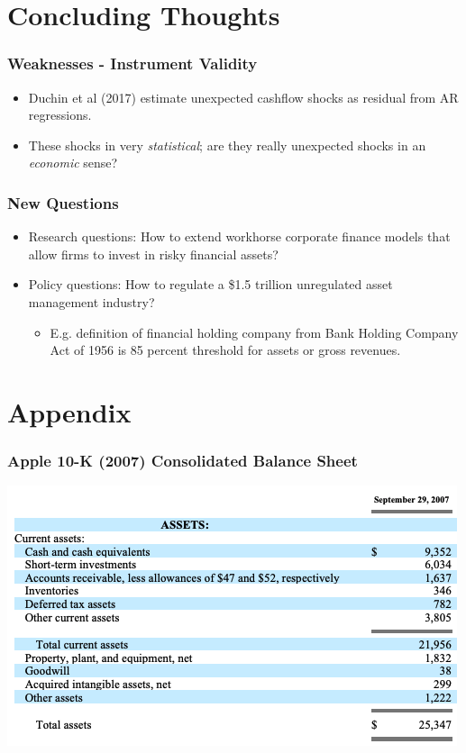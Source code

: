 \documentclass[handout]{beamer}
\begin{document}
\section{Concluding Thoughts}




\begin{frame}
\frametitle{Weaknesses - Instrument Validity}
\begin{itemize}[<+->]
\item Duchin et al (2017) estimate unexpected cashflow shocks as residual from AR regressions.
\bigskip
\item These shocks in very \textit{statistical}; are they really unexpected shocks in an \textit{economic} sense?
\end{itemize}
\end{frame}


\begin{frame}
\frametitle{New Questions}
\begin{itemize}[<+->]
\item Research questions: How to extend workhorse corporate finance models that allow firms to invest in risky financial assets?
\bigskip
\item Policy questions: How to regulate a \$1.5 trillion unregulated asset management industry?
\begin{itemize}
\item E.g. definition of financial holding company from Bank Holding Company Act of 1956 is 85 percent threshold for assets or gross revenues.
\end{itemize}
\end{itemize}
\end{frame}



\section{Appendix}






\begin{frame}[label=APPL2007]
\frametitle{Apple 10-K (2007) Consolidated Balance Sheet}

\centering
\includegraphics[scale=0.5]{AAPL_2007_bs}
\end{frame}
\end{document}
